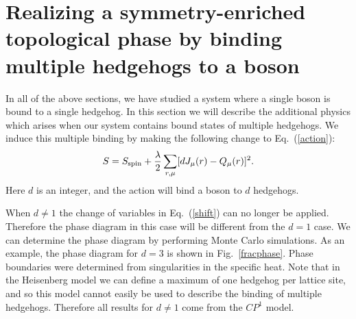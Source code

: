 \documentclass[prb,twocolumn]{revtex4-1}
\begin{document}
\section{Realizing a symmetry-enriched topological phase by binding multiple hedgehogs to a boson}
\label{section::multiple}

In all of the above sections, we have studied a system where a single boson is bound to a single hedgehog. In this section we will describe the additional physics which arises when our system contains bound states of multiple hedgehogs. We induce this multiple binding by making the following change to Eq.~(\ref{action}):
\begin{equation}
S=S_{\rm spin}+\frac{\lambda}{2}\sum_{r,\mu} [ dJ_\mu(r)- Q_\mu(r)]^2.
\label{cdbind}
\end{equation}
Here $d$ is an integer, and the action will bind a boson to $d$ hedgehogs. 

When $d\neq1$ the change of variables in Eq.~(\ref{shift}) can no longer be applied. Therefore the phase diagram in this case will be different from the $d=1$ case. We can determine the phase diagram by performing Monte Carlo simulations. As an example, the phase diagram for $d=3$ is shown in Fig.~\ref{fracphase}. Phase boundaries were determined from singularities in the specific heat. Note that in the Heisenberg model we can define a maximum of one hedgehog per lattice site, and so this model cannot easily be used to describe the binding of  multiple hedgehogs. Therefore all results for $d \neq 1$ come from the $CP^1$ model. 
\end{document}
